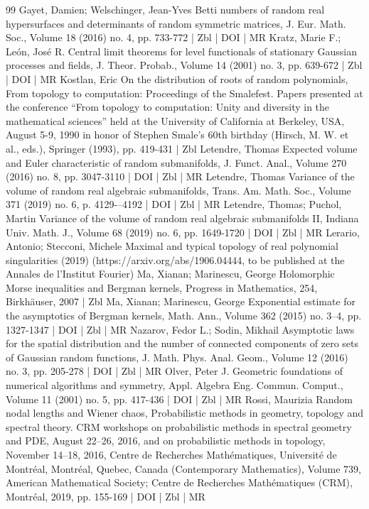 \documentclass[10pt]{amsart}
\theoremstyle{definition}\newtheorem{defi}[theo]{Definition}\newtheorem{rema}[theo]{Remark}\newtheorem{exam}[theo]{Example}\newtheorem{exem}[theo]{Example}\newtheorem{nota}[theo]{Notation}
\begin{document}
\begin{thebibliography}{99}
Gayet, Damien; Welschinger, Jean-Yves Betti numbers of random real hypersurfaces and determinants of random symmetric matrices, J. Eur. Math. Soc., Volume 18 (2016) no. 4, pp. 733-772 | Zbl | DOI | MR
Kratz, Marie F.; León, José R. Central limit theorems for level functionals of stationary Gaussian processes and fields, J. Theor. Probab., Volume 14 (2001) no. 3, pp. 639-672 | Zbl | DOI | MR
Kostlan, Eric On the distribution of roots of random polynomials, From topology to computation: Proceedings of the Smalefest. Papers presented at the conference “From topology to computation: Unity and diversity in the mathematical sciences” held at the University of California at Berkeley, USA, August 5-9, 1990 in honor of Stephen Smale’s 60th birthday (Hirsch, M. W. et al., eds.), Springer (1993), pp. 419-431 | Zbl
Letendre, Thomas Expected volume and Euler characteristic of random submanifolds, J. Funct. Anal., Volume 270 (2016) no. 8, pp. 3047-3110 | DOI | Zbl | MR
Letendre, Thomas Variance of the volume of random real algebraic submanifolds, Trans. Am. Math. Soc., Volume 371 (2019) no. 6, p. 4129-–4192 | DOI | Zbl | MR
Letendre, Thomas; Puchol, Martin Variance of the volume of random real algebraic submanifolds II, Indiana Univ. Math. J., Volume 68 (2019) no. 6, pp. 1649-1720 | DOI | Zbl | MR
Lerario, Antonio; Stecconi, Michele Maximal and typical topology of real polynomial singularities (2019) (https://arxiv.org/abs/1906.04444, to be published at the Annales de l’Institut Fourier)
Ma, Xianan; Marinescu, George Holomorphic Morse inequalities and Bergman kernels, Progress in Mathematics, 254, Birkhäuser, 2007 | Zbl
Ma, Xianan; Marinescu, George Exponential estimate for the asymptotics of Bergman kernels, Math. Ann., Volume 362 (2015) no. 3–4, pp. 1327-1347 | DOI | Zbl | MR
Nazarov, Fedor L.; Sodin, Mikhail Asymptotic laws for the spatial distribution and the number of connected components of zero sets of Gaussian random functions, J. Math. Phys. Anal. Geom., Volume 12 (2016) no. 3, pp. 205-278 | DOI | Zbl | MR
Olver, Peter J. Geometric foundations of numerical algorithms and symmetry, Appl. Algebra Eng. Commun. Comput., Volume 11 (2001) no. 5, pp. 417-436 | DOI | Zbl | MR
Rossi, Maurizia Random nodal lengths and Wiener chaos, Probabilistic methods in geometry, topology and spectral theory. CRM workshops on probabilistic methods in spectral geometry and PDE, August 22–26, 2016, and on probabilistic methods in topology, November 14–18, 2016, Centre de Recherches Mathématiques, Université de Montréal, Montréal, Quebec, Canada (Contemporary Mathematics), Volume 739, American Mathematical Society; Centre de Recherches Mathématiques (CRM), Montréal, 2019, pp. 155-169 | DOI | Zbl | MR

\end{thebibliography}
\end{document}
